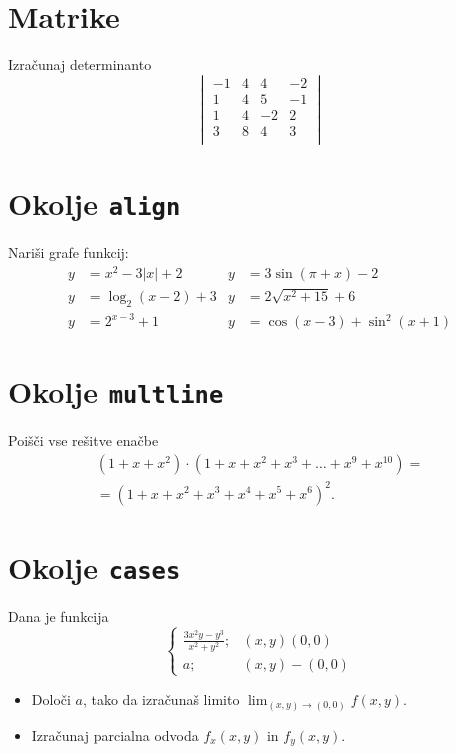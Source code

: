 \documentclass[a4paper,12pt]{article}
\begin{document}
\section*{Matrike}
Izračunaj determinanto
\[
\begin{vmatrix}
   -1 & 4 & 4 & -2 \\
    1 & 4 & 5 & -1 \\
    1 & 4 & -2 & 2 \\
    3 & 8 & 4 & 3 \\
\end{vmatrix}
\]
\section*{Okolje \texttt{align}}
Nariši grafe funkcij:
\begin{align*}
y &= x^2 - 3|x| + 2  &  y &= 3 \sin(\pi+x) - 2\\
y &= \log_2(x-2) + 3 &  y &= 2 \sqrt{x^2+15} + 6\\
y &= 2^{x-3} + 1     &  y &= \cos(x-3) + \sin^2(x+1)
\end{align*}

\section*{Okolje \texttt{multline}}
Poišči vse rešitve enačbe
\begin{multline*}
(1+x+x^2) \cdot (1+x+x^2+x^3+\ldots+x^9+x^{10}) =\\
=(1+x+x^2+x^3+x^4+x^5+x^6)^2.
\end{multline*}

\section*{Okolje \texttt{cases}}
Dana je funkcija
\[
\begin{cases}
   \frac{3x^2y-y^3}{x^2+y^2};   &(x,y) (0,0)\\
   a;  &(x,y) - (0,0)
\end{cases}
\]
\begin{itemize}
\item Določi \(a\), tako da izračunaš limito \( \lim_{(x,y)\to(0,0)} f(x,y) \).
\item Izračunaj parcialna odvoda \(f_x(x,y)\) in \(f_y(x,y)\).
\end{itemize}
\end{document}
